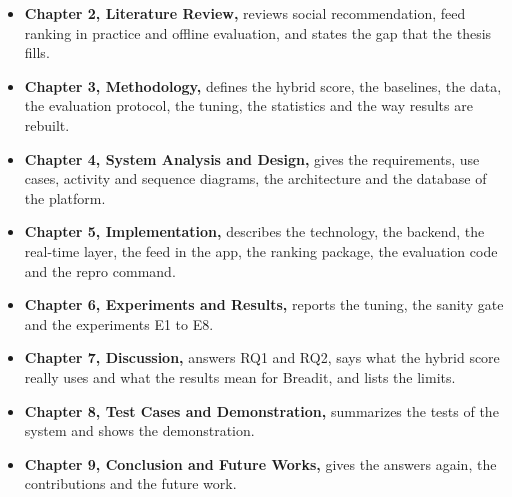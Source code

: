 \begin{itemize}
  \item \textbf{Chapter 2, Literature Review,} reviews social recommendation, feed ranking in practice and offline evaluation, and states the gap that the thesis fills.
  \item \textbf{Chapter 3, Methodology,} defines the hybrid score, the baselines, the data, the evaluation protocol, the tuning, the statistics and the way results are rebuilt.
  \item \textbf{Chapter 4, System Analysis and Design,} gives the requirements, use cases, activity and sequence diagrams, the architecture and the database of the platform.
  \item \textbf{Chapter 5, Implementation,} describes the technology, the backend, the real-time layer, the feed in the app, the ranking package, the evaluation code and the repro command.
  \item \textbf{Chapter 6, Experiments and Results,} reports the tuning, the sanity gate and the experiments E1 to E8.
  \item \textbf{Chapter 7, Discussion,} answers RQ1 and RQ2, says what the hybrid score really uses and what the results mean for Breadit, and lists the limits.
  \item \textbf{Chapter 8, Test Cases and Demonstration,} summarizes the tests of the system and shows the demonstration.
  \item \textbf{Chapter 9, Conclusion and Future Works,} gives the answers again, the contributions and the future work.
\end{itemize}
